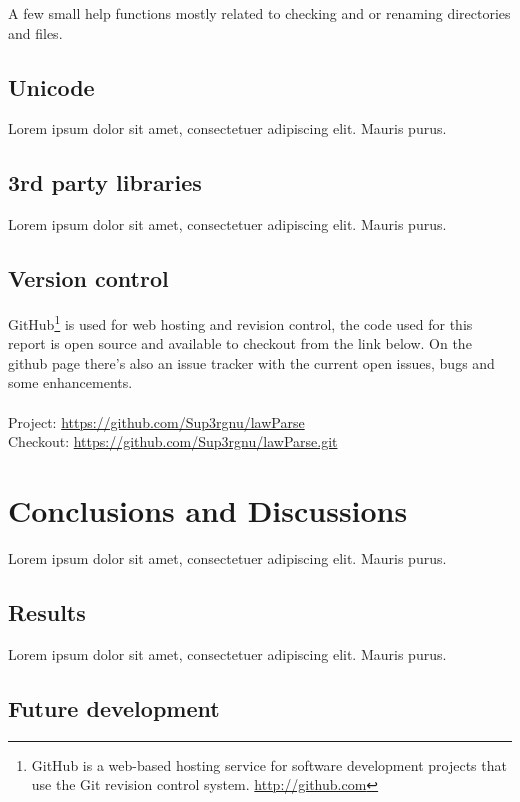 \documentclass[a4paper,11pt]{kth-mag}
\begin{document}
A few small help functions mostly related to checking and or renaming directories and files. 

\section{Unicode}

Lorem ipsum dolor sit amet, consectetuer adipiscing elit. Mauris
purus. 

\section{3rd party libraries}

Lorem ipsum dolor sit amet, consectetuer adipiscing elit. Mauris
purus. 

\section{Version control}

GitHub\footnote{GitHub is a web-based hosting service for software development
projects that use the Git revision control system. \url{http://github.com}} is
used for web hosting and revision control, the code used for this report is
open source and available to checkout from the link below. On the github page
there's also an issue tracker with the current open issues, bugs and some
enhancements.\\\\
Project: \url{https://github.com/Sup3rgnu/lawParse}\\
Checkout: \url{https://github.com/Sup3rgnu/lawParse.git}

\chapter{Conclusions and Discussions}

Lorem ipsum dolor sit amet, consectetuer adipiscing elit. Mauris
purus. 

\section{Results}

Lorem ipsum dolor sit amet, consectetuer adipiscing elit. Mauris
purus. 

\section{Future development}
\end{document}
